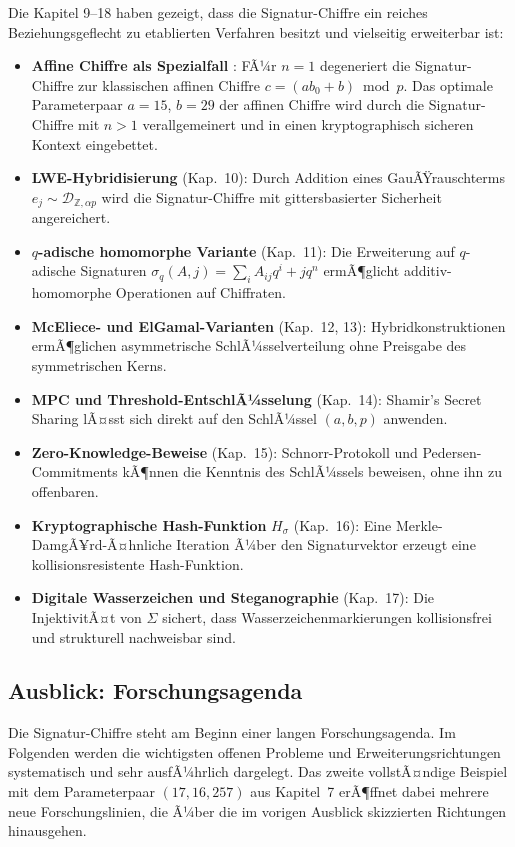 ﻿\documentclass[a4paper,12pt]{scrreprt}
\theoremstyle{definition}
\begin{document}
Die Kapitel 9--18 haben gezeigt, dass die Signatur-Chiffre ein reiches Beziehungsgeflecht zu etablierten Verfahren besitzt und vielseitig erweiterbar ist:

\begin{itemize}
  \item \textbf{Affine Chiffre als Spezialfall} \cite{Epp26c}: FÃ¼r $n=1$ degeneriert die Signatur-Chiffre zur klassischen affinen Chiffre $c = (ab_0 + b) \bmod p$. Das optimale Parameterpaar $a=15$, $b=29$ der affinen Chiffre \cite{Epp26c} wird durch die Signatur-Chiffre mit $n>1$ verallgemeinert und in einen kryptographisch sicheren Kontext eingebettet.
  \item \textbf{LWE-Hybridisierung} (Kap.~10): Durch Addition eines GauÃŸrauschterms $e_j \sim \mathcal{D}_{\mathbb{Z},\alpha p}$ wird die Signatur-Chiffre mit gittersbasierter Sicherheit \cite{Reg05} angereichert.
  \item \textbf{$q$-adische homomorphe Variante} (Kap.~11): Die Erweiterung auf $q$-adische Signaturen $\sigma_q(A,j) = \sum_i A_{ij} q^i + j q^n$ ermÃ¶glicht additiv-homomorphe Operationen auf Chiffraten.
  \item \textbf{McEliece- und ElGamal-Varianten} (Kap.~12, 13): Hybridkonstruktionen ermÃ¶glichen asymmetrische SchlÃ¼sselverteilung ohne Preisgabe des symmetrischen Kerns.
  \item \textbf{MPC und Threshold-EntschlÃ¼sselung} (Kap.~14): Shamir's Secret Sharing \cite{Sha79} lÃ¤sst sich direkt auf den SchlÃ¼ssel $(a,b,p)$ anwenden.
  \item \textbf{Zero-Knowledge-Beweise} (Kap.~15): Schnorr-Protokoll und Pedersen-Commitments kÃ¶nnen die Kenntnis des SchlÃ¼ssels beweisen, ohne ihn zu offenbaren.
  \item \textbf{Kryptographische Hash-Funktion} $H_\sigma$ (Kap.~16): Eine Merkle-DamgÃ¥rd-Ã¤hnliche Iteration Ã¼ber den Signaturvektor erzeugt eine kollisionsresistente Hash-Funktion.
  \item \textbf{Digitale Wasserzeichen und Steganographie} (Kap.~17): Die InjektivitÃ¤t von $\Sigma$ sichert, dass Wasserzeichenmarkierungen kollisionsfrei und strukturell nachweisbar sind.
\end{itemize}

\subsection{Ausblick: Forschungsagenda}

Die Signatur-Chiffre steht am Beginn einer langen Forschungsagenda. Im Folgenden werden die wichtigsten offenen Probleme und Erweiterungsrichtungen systematisch und sehr ausfÃ¼hrlich dargelegt. Das zweite vollstÃ¤ndige Beispiel mit dem Parameterpaar $(17, 16, 257)$ aus Kapitel~7 erÃ¶ffnet dabei mehrere neue Forschungslinien, die Ã¼ber die im vorigen Ausblick skizzierten Richtungen hinausgehen.
\end{document}
